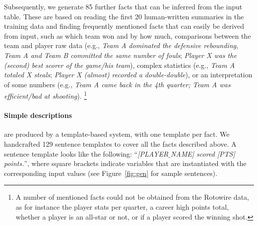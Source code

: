 Subsequently, we generate 85 further facts that can be inferred from the input table. These are based on reading the first 20 human-written summaries in the training data and finding frequently mentioned facts that can easily be derived from input, such as which team won and by how much, comparisons between the team and player raw data (e.g., \emph{Team A dominated the defensive rebounding}, \emph{Team A and Team B committed the same number of fouls}; \emph{Player X was the (second) best scorer of the game/his team}), complex statistics (e.g., \emph{Team A totaled X steals}; \emph{Player X (almost) recorded a double-double}), or an interpretation of some numbers (e.g., \emph{Team A came back in the 4th quarter; Team A was efficient/bad at shooting}).%
\footnote{\label{fn1}A number of mentioned facts could not be obtained from the Rotowire data, as for instance the player stats per quarter, a career high points total, whether a player is an all-star or not, or if a player scored the winning shot.}

\paragraph{Simple descriptions} are produced by a template-based system, with one template per fact. We handcrafted 129 sentence templates to cover all the facts described above. A sentence template looks like the following: “\textit{[PLAYER$\_$NAME] scored [PTS] points.}”, where square brackets indicate variables that are instantiated with the corresponding input values (see Figure~\ref{fig:gen} for sample sentences).

